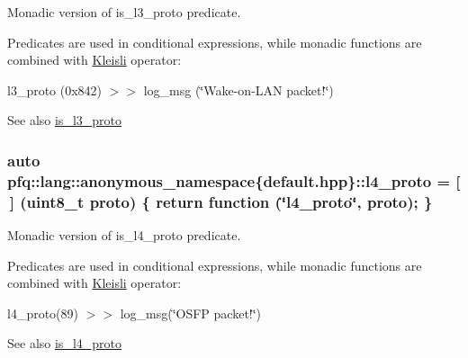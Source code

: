 Monadic version of {\ttfamily is\+\_\+l3\+\_\+proto} predicate. 

Predicates are used in conditional expressions, while monadic functions are combined with \hyperlink{structpfq_1_1lang_1_1Kleisli}{Kleisli} operator\+:

l3\+\_\+proto (0x842) $>$$>$ log\+\_\+msg (\char`\"{}\+Wake-\/on-\/\+L\+A\+N packet!\char`\"{})

\begin{DoxySeeAlso}{See also}
\hyperlink{namespacepfq_1_1lang_1_1anonymous__namespace_02default_8hpp_03_a814bb9c3c833dc2af342d695b1d503e8}{is\+\_\+l3\+\_\+proto} 
\end{DoxySeeAlso}
\subsubsection[{\texorpdfstring{l4\+\_\+proto}{l4_proto}}]{\setlength{\rightskip}{0pt plus 5cm}auto pfq\+::lang\+::anonymous\+\_\+namespace\{default.\+hpp\}\+::l4\+\_\+proto = \mbox{[}$\,$\mbox{]} (uint8\+\_\+t proto) \{ return {\bf function} (\char`\"{}l4\+\_\+proto\char`\"{}, proto); \}}\hypertarget{namespacepfq_1_1lang_1_1anonymous__namespace_02default_8hpp_03_a8ad2208c91dc3cd4378e715aab5fb4b7}{}\label{namespacepfq_1_1lang_1_1anonymous__namespace_02default_8hpp_03_a8ad2208c91dc3cd4378e715aab5fb4b7}


Monadic version of {\ttfamily is\+\_\+l4\+\_\+proto} predicate. 

Predicates are used in conditional expressions, while monadic functions are combined with \hyperlink{structpfq_1_1lang_1_1Kleisli}{Kleisli} operator\+:

l4\+\_\+proto(89) $>$$>$ log\+\_\+msg(\char`\"{}\+O\+S\+F\+P packet!\char`\"{})

\begin{DoxySeeAlso}{See also}
\hyperlink{namespacepfq_1_1lang_1_1anonymous__namespace_02default_8hpp_03_a9d06d4dedca1ebdc3b270cb2f3e9e42b}{is\+\_\+l4\+\_\+proto} 
\end{DoxySeeAlso}
